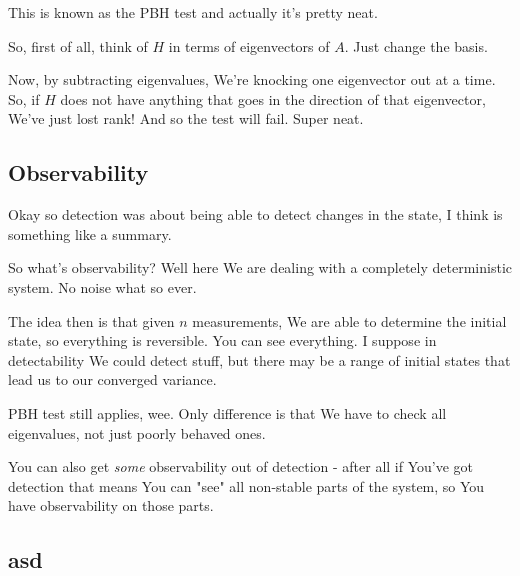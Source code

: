 \documentclass{article}
\begin{document}
		This is known as the PBH test and actually it's pretty neat.
		
		So, first of all, think of $H$ in terms of eigenvectors of $A$. Just change the basis.
		
		Now, by subtracting eigenvalues, We're knocking one eigenvector out at a time. So, if $H$ does not have anything that goes in the direction of that eigenvector, We've just lost rank! And so the test will fail. Super neat.
		
	\subsection{Observability}
	
		Okay so detection was about being able to detect changes in the state, I think is something like a summary.
		
		So what's observability? Well here We are dealing with a completely deterministic system. No noise what so ever.
		
		The idea then is that given $n$ measurements, We are able to determine the initial state, so everything is reversible. You can see everything. I suppose in detectability We could detect stuff, but there may be a range of initial states that lead us to our converged variance.
		
		PBH test still applies, wee. Only difference is that We have to check all eigenvalues, not just poorly behaved ones.
		
		You can also get \textit{some} observability out of detection - after all if You've got detection that means You can "see" all non-stable parts of the system, so You have observability on those parts.
		
	\subsection{asd}
		
		
		
		
		
		
		
		
		
		
		
		
		
		
		
		
	
\end{document}
